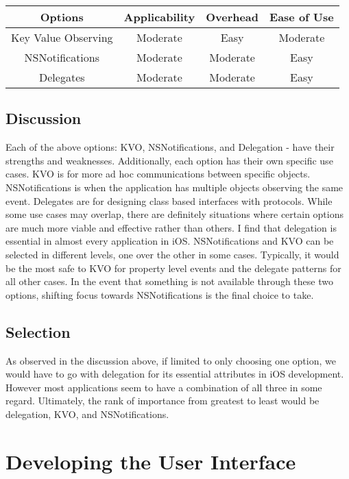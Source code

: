 \documentclass[letterpaper,10pt,titlepage]{article}
\begin{document}
\begin{center}
\begin{tabular}{ |c|c|c|c| }
 \hline
 Options & Applicability & Overhead & Ease of Use \\ \hline
 Key Value Observing & Moderate & Easy & Moderate \\ \hline
 NSNotifications & Moderate & Moderate & Easy \\ \hline
 Delegates & Moderate & Moderate & Easy \\
 \hline
\end{tabular}
\end{center}

\subsection{Discussion}

Each of the above options: KVO, NSNotifications, and Delegation - have their strengths and weaknesses. Additionally, each option has their own specific use cases. KVO is for more ad hoc communications between specific objects. NSNotifications is when the application has multiple objects observing the same event. Delegates are for designing class based interfaces with protocols. While some use cases may overlap, there are definitely situations where certain options are much more viable and effective rather than others. I find that delegation is essential in almost every application in iOS. NSNotifications and KVO can be selected in different levels, one over the other in some cases. Typically, it would be the most safe to KVO for property level events and the delegate patterns for all other cases. In the event that something is not available through these two options, shifting focus towards NSNotifications is the final choice to take.

\subsection{Selection}

As observed in the discussion above, if limited to only choosing one option, we would have to go with delegation for its essential attributes in iOS development. However most applications seem to have a combination of all three in some regard. Ultimately, the rank of importance from greatest to least would be delegation, KVO, and NSNotifications.

\section{Developing the User Interface}
\end{document}
